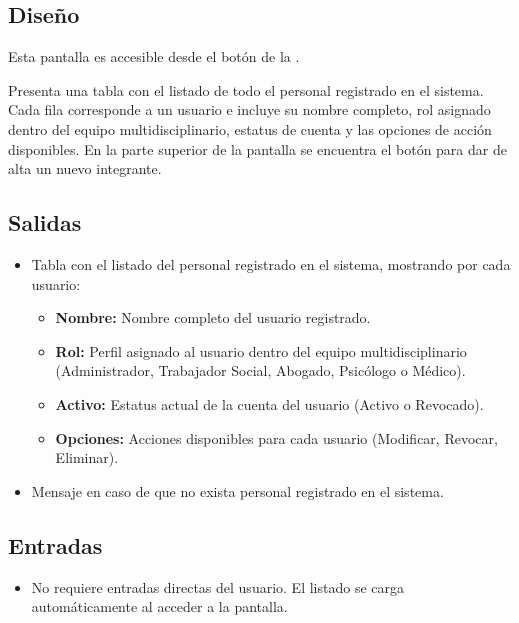 \subsection{Diseño}
Esta pantalla  es 
accesible desde el botón  de la 
. 

Presenta una tabla con el listado de todo el personal registrado 
en el sistema. Cada fila corresponde a un usuario e incluye su 
nombre completo, rol asignado dentro del equipo multidisciplinario, 
estatus de cuenta y las opciones de acción disponibles. En la parte 
superior de la pantalla se encuentra el botón 
 para dar de alta un nuevo integrante.


\subsection{Salidas}
\begin{itemize}
	\item Tabla con el listado del personal registrado en el sistema, 
	mostrando por cada usuario:
	\begin{itemize}
		\item \textbf{Nombre:} Nombre completo del usuario registrado.
		\item \textbf{Rol:} Perfil asignado al usuario dentro del 
		equipo multidisciplinario (Administrador, Trabajador Social, 
		Abogado, Psicólogo o Médico).
		\item \textbf{Activo:} Estatus actual de la cuenta del usuario 
		(Activo o Revocado).
		\item \textbf{Opciones:} Acciones disponibles para cada usuario 
		(Modificar, Revocar, Eliminar).
	\end{itemize}
	\item Mensaje  en caso de 
	que no exista personal registrado en el sistema.
\end{itemize}

\subsection{Entradas}
\begin{itemize}
	\item No requiere entradas directas del usuario. El listado se 
	carga automáticamente al acceder a la pantalla.
\end{itemize}


